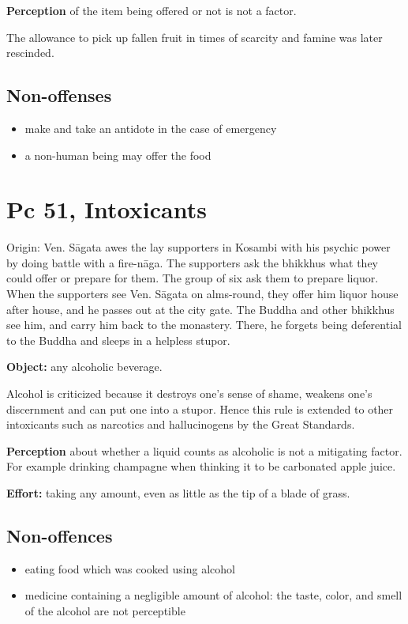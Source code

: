\textbf{Perception} of the item being offered or not is not a factor.

The allowance to pick up fallen fruit in times of scarcity and famine
was later rescinded.

\subsection{Non-offenses}

\begin{itemize}
\tightlist
\item
  make and take an antidote in the case of emergency
\item
  a non-human being may offer the food
\end{itemize}

\section{Pc 51, Intoxicants}

Origin: Ven. Sāgata awes the lay supporters in Kosambi with his psychic
power by doing battle with a fire-nāga. The supporters ask the bhikkhus
what they could offer or prepare for them. The group of six ask them to
prepare liquor. When the supporters see Ven. Sāgata on alms-round, they
offer him liquor house after house, and he passes out at the city gate.
The Buddha and other bhikkhus see him, and carry him back to the
monastery. There, he forgets being deferential to the Buddha and sleeps
in a helpless stupor.

\textbf{Object:} any alcoholic beverage.

Alcohol is criticized because it destroys one's sense of shame, weakens
one's discernment and can put one into a stupor. Hence this rule is
extended to other intoxicants such as narcotics and hallucinogens by the
Great Standards.

\textbf{Perception} about whether a liquid counts as alcoholic is not a
mitigating factor. For example drinking champagne when thinking it to be
carbonated apple juice.

\textbf{Effort:} taking any amount, even as little as the tip of a blade
of grass.

\subsection{Non-offences}

\begin{itemize}
\tightlist
\item
  eating food which was cooked using alcohol
\item
  medicine containing a negligible amount of alcohol: the taste, color,
  and smell of the alcohol are not perceptible
\end{itemize}

